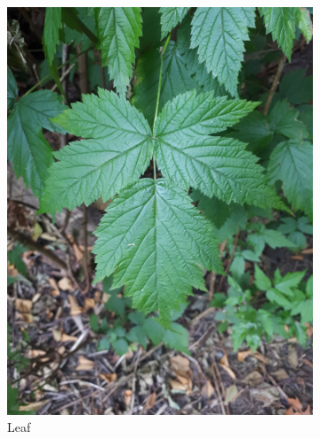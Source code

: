 \begin{figure}
\centering
\begin{subfigure}{0.48\textwidth}
    \includegraphics[width=\textwidth]{rubus/spectabilis_leaf_01}
    \caption{Leaf}
    \label{fig:rub:spectabilis:leaf}
\end{subfigure}
\hfill
\begin{subfigure}{0.48\textwidth}

\end{subfigure}
\end{figure}
